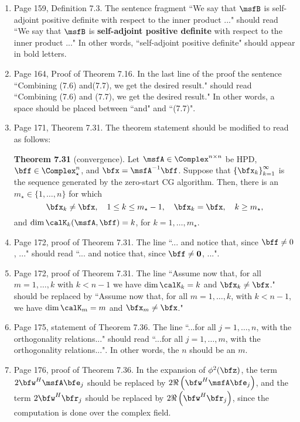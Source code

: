 \documentclass{book}
\begin{document}
	\begin{enumerate}
	\item
Page 159, Definition 7.3. The sentence fragment ``We say that $\msfB$ is self-adjoint positive definite with respect to the inner product ..." should read ``We say that $\msfB$ is \textbf{self-adjoint positive definite} with respect to the inner product ..." In other words, ``self-adjoint positive definite" should appear in bold letters.

	\item
Page 164, Proof of Theorem 7.16. In the last line of the proof the sentence ``Combining (7.6) and(7.7), we get the desired result." should read ``Combining (7.6) and (7.7), we get the desired result." In other words, a space should be placed between ``and" and ``(7.7)".

	\item
Page 171, Theorem 7.31. The theorem statement should be modified to read as follows:

\textbf{Theorem 7.31} (convergence). Let $\msfA\in\Complex^{n\times n}$ be HPD, $\bff\in \Complex^n_\star$, and $\bfx = \msfA^{-1}\bff$. Suppose that $\left\{ \bfx_k \right\}_{k = 1}^\infty$ is the sequence generated by the zero-start CG algorithm. Then, there is an $m_\star\in\{1,\ldots , n\}$ for which
	\[
\bfx_k\ne \bfx, \quad 1\le k \le m_\star-1, \quad \bfx_k = \bfx, \quad k\ge m_\star,
	\] 
and $\dim \calK_k(\msfA,\bff) = k$, for $k = 1, \ldots, m_\star$.

	\item
Page 172, proof of Theorem 7.31. The line ``... and notice that, since $\bff\ne 0$, ..." should read ``... and notice that, since $\bff\ne {\bf 0}$, ...".

	\item
Page 172, proof of Theorem 7.31. The line ``Assume now that, for all $m = 1, \ldots, k$ with $k < n-1$ we have $\dim \calK_k = k$ and $\bfx_k \neq \bfx$." should be replaced by ``Assume now that, for all $m = 1, \ldots, k$, with $k < n-1$, we have $\dim \calK_m = m$ and $\bfx_m \neq \bfx$."

	\item
Page 175, statement of Theorem 7.36. The line ``...for all $j = 1, \ldots, n$, with the orthogonality relations..." should read ``...for all $j = 1, \ldots, m$, with the orthogonality relations...". In other words, the $n$ should be an $m$.


	\item
Page 176, proof of Theorem 7.36. In the expansion of $\phi^2(\bfz)$, the term $2\bfw^H\msfA\bfe_j$ should be replaced by $2\Re\left(\bfw^H\msfA\bfe_j\right)$, and the term $2\bfw^H\bfr_j$ should be replaced by $2\Re\left(\bfw^H\bfr_j\right)$, since the computation is done over the complex field.


	\end{enumerate}
	
\end{document}
